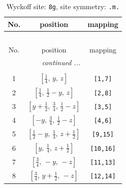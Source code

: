 \documentclass[fleqn,8pt]{jsarticle}
\begin{document}
\begin{longtable}{ccc}
\caption{Wyckoff site: {\tt 8g}, site symmetry: {\tt .m.}}
 \\
 \hline \hline
No. & position & mapping \\ \hline \endfirsthead

\multicolumn{2}{l}{\tablename\ \thetable{}} \\
 \hline \hline
No. & position & mapping \\ \hline \endhead

 \hline \hline
\multicolumn{2}{r}{\footnotesize\it continued ...} \\ \endfoot

 \hline \hline
\multicolumn{2}{r}{} \\ \endlastfoot

1 & $\left[ \frac{1}{4},\, y,\, z \right]$ & {\tt [1,7]} \\ \hline
2 & $\left[ \frac{1}{4},\, \frac{1}{2} - y,\, z \right]$ & {\tt [2,8]} \\ \hline
3 & $\left[ y + \frac{1}{2},\, \frac{3}{4},\, \frac{1}{2} - z \right]$ & {\tt [3,5]} \\ \hline
4 & $\left[ - y,\, \frac{3}{4},\, \frac{1}{2} - z \right]$ & {\tt [4,6]} \\ \hline
5 & $\left[ \frac{1}{2} - y,\, \frac{1}{4},\, z + \frac{1}{2} \right]$ & {\tt [9,15]} \\ \hline
6 & $\left[ y,\, \frac{1}{4},\, z + \frac{1}{2} \right]$ & {\tt [10,16]} \\ \hline
7 & $\left[ \frac{3}{4},\, - y,\, - z \right]$ & {\tt [11,13]} \\ \hline
8 & $\left[ \frac{3}{4},\, y + \frac{1}{2},\, - z \right]$ & {\tt [12,14]} \\
\end{longtable}
\renewcommand{\arraystretch}{1.2}
\end{document}
